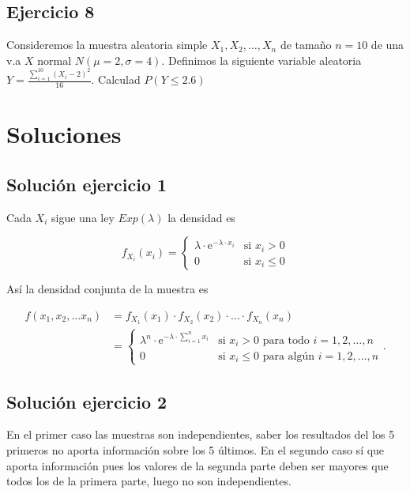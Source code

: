 \documentclass[]{article}
\begin{document}
\hypertarget{ejercicio-8}{%
\subsection{Ejercicio 8}\label{ejercicio-8}}

Consideremos la muestra aleatoria simple \(X_1,X_2,\ldots,X_{n}\) de
tamaño \(n=10\) de una v.a \(X\) normal \(N(\mu=2,\sigma=4)\). Definimos
la siguiente variable aleatoria
\(Y=\frac{\sum\limits_{i=1}^{10}{(X_i-2)}^2}{16}\). Calculad
\(P(Y\leq 2.6)\)

\hypertarget{soluciones}{%
\section{Soluciones}\label{soluciones}}

\hypertarget{soluciuxf3n-ejercicio-1}{%
\subsection{Solución ejercicio 1}\label{soluciuxf3n-ejercicio-1}}

Cada \(X_i\) sigue una ley \(Exp(\lambda)\) la densidad es

\[
f_{X_i}(x_i)=\left\{
\begin{array}{ll}
\lambda\cdot\mathrm{e}^{-\lambda\cdot x_i} & \mbox{si }x_i>0\\
0 & \mbox{si }x_i\leq 0
\end{array}
\right.
\]

Así la densidad conjunta de la muestra es

\[\begin{array}{rl}
f(x_1,x_2,\ldots x_n) &=f_{X_1}(x_1)\cdot f_{X_2}(x_2)\cdot \ldots\cdot f_{X_n}(x_n)\\
&=
\left\{
\begin{array}{ll}
\lambda^n \cdot\mathrm{e}^{-\lambda\cdot \sum_{i=1}^n x_i} & \mbox{si }x_i>0 \mbox{ para todo } i=1,2,\ldots, n\\
0 & \mbox{si } x_i\leq 0 \mbox{ para algún } i=1,2,\ldots, n 
\end{array}
\right.
.
\end{array}
\]

\hypertarget{soluciuxf3n-ejercicio-2}{%
\subsection{Solución ejercicio 2}\label{soluciuxf3n-ejercicio-2}}

En el primer caso las muestras son independientes, saber los resultados
del los 5 primeros no aporta información sobre los 5 últimos. En el
segundo caso sí que aporta información pues los valores de la segunda
parte deben ser mayores que todos los de la primera parte, luego no son
independientes.
\end{document}
